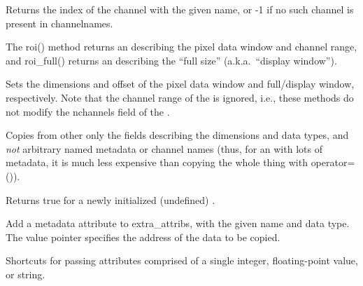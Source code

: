 Returns the index of the channel with the given name, or -1 if no such
channel is present in {\cf channelnames}.
\apiend

The {\cf roi()} method returns an \ROI describing the pixel data window and
channel range, and {\cf roi_full()} returns an \ROI describing the ``full
size'' (a.k.a.\ ``display window'').
\apiend

Sets the dimensions and offset of the pixel data window and full/display
window, respectively. Note that the channel range of the \ROI is ignored,
i.e., these methods do not modify the {\cf nchannels} field of the \ImageSpec.
\apiend

Copies from {\cf other} only the fields describing the dimensions and
data types, and \emph{not} arbitrary named metadata or channel names (thus,
for an \ImageSpec with lots of metadata, it is much less expensive than
copying the whole thing with {\cf operator=()}).
\apiend

Returns {\cf true} for a newly initialized (undefined) \ImageSpec.
\apiend



Add a metadata attribute to {\cf extra_attribs}, with the given name and
data type.  The {\cf value} pointer specifies
the address of the data to be copied.
\apiend

Shortcuts for passing attributes comprised of a single integer,
floating-point value, or string.
\apiend



